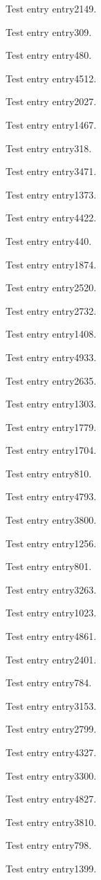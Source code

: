 Test entry \gls{entry2149}.

Test entry \gls{entry309}.

Test entry \gls{entry480}.

Test entry \gls{entry4512}.

Test entry \gls{entry2027}.

Test entry \gls{entry1467}.

Test entry \gls{entry318}.

Test entry \gls{entry3471}.

Test entry \gls{entry1373}.

Test entry \gls{entry4422}.

Test entry \gls{entry440}.

Test entry \gls{entry1874}.

Test entry \gls{entry2520}.

Test entry \gls{entry2732}.

Test entry \gls{entry1408}.

Test entry \gls{entry4933}.

Test entry \gls{entry2635}.

Test entry \gls{entry1303}.

Test entry \gls{entry1779}.

Test entry \gls{entry1704}.

Test entry \gls{entry810}.

Test entry \gls{entry4793}.

Test entry \gls{entry3800}.

Test entry \gls{entry1256}.

Test entry \gls{entry801}.

Test entry \gls{entry3263}.

Test entry \gls{entry1023}.

Test entry \gls{entry4861}.

Test entry \gls{entry2401}.

Test entry \gls{entry784}.

Test entry \gls{entry3153}.

Test entry \gls{entry2799}.

Test entry \gls{entry4327}.

Test entry \gls{entry3300}.

Test entry \gls{entry4827}.

Test entry \gls{entry3810}.

Test entry \gls{entry798}.

Test entry \gls{entry1399}.

